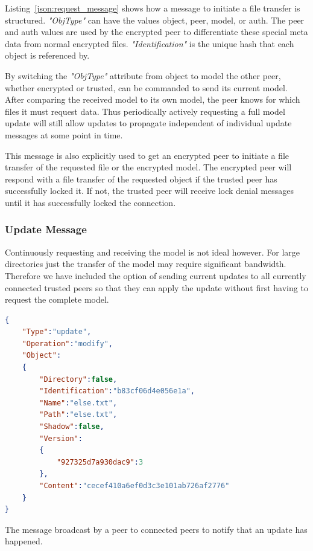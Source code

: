 Listing~\ref{json:request_message} shows how a message to initiate a file transfer is structured.
\textit{"ObjType"} can have the values object, peer, model, or auth.
The peer and auth values are used by the encrypted peer to differentiate these special meta data from normal encrypted files.
\textit{"Identification"} is the unique hash that each object is referenced by.

By switching the \textit{"ObjType"} attribute from object to model the other peer, whether encrypted or trusted, can be commanded to send its current model.
After comparing the received model to its own model, the peer knows for which files it must request data.
Thus periodically actively requesting a full model update will still allow updates to propagate independent of individual update messages at some point in time.

This message is also explicitly used to get an encrypted peer to initiate a file transfer of the requested file or the encrypted model.
The encrypted peer will respond with a file transfer of the requested object if the trusted peer has successfully locked it.
If not, the trusted peer will receive lock denial messages until it has successfully locked the connection.

\subsubsection{Update Message}
\label{subs:Update Message}

Continuously requesting and receiving the model is not ideal however.
For large directories just the transfer of the model may require significant bandwidth.
Therefore we have included the option of sending current updates to all currently connected trusted peers so that they can apply the update without first having to request the complete model.

\begin{listing}[htp]
    \begin{lstlisting}[language=json,firstnumber=0]
{
    "Type":"update",
    "Operation":"modify",
    "Object":
    {
        "Directory":false,
        "Identification":"b83cf06d4e056e1a",
        "Name":"else.txt",
        "Path":"else.txt",
        "Shadow":false,
        "Version":
        {
            "927325d7a930dac9":3
        },
        "Content":"cecef410a6ef0d3c3e101ab726af2776"
    }
}
    \end{lstlisting}
\caption[Update Object Message]{The message broadcast by a peer to connected peers to notify that an update has happened.}
\label{json:update_object}
\end{listing}

